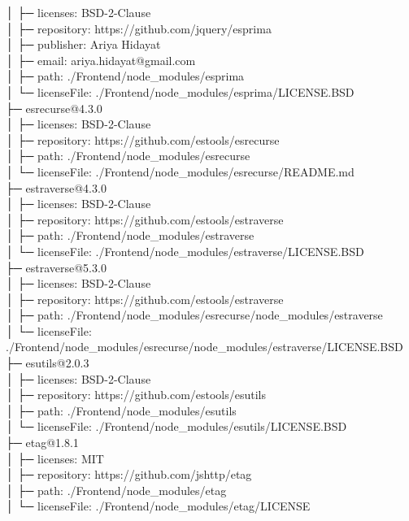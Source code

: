 │  ├─ licenses: BSD-2-Clause\\
│  ├─ repository: https://github.com/jquery/esprima\\
│  ├─ publisher: Ariya Hidayat\\
│  ├─ email: ariya.hidayat@gmail.com\\
│  ├─ path: ./Frontend/node\_modules/esprima\\
│  └─ licenseFile: ./Frontend/node\_modules/esprima/LICENSE.BSD\\
├─ esrecurse@4.3.0\\
│  ├─ licenses: BSD-2-Clause\\
│  ├─ repository: https://github.com/estools/esrecurse\\
│  ├─ path: ./Frontend/node\_modules/esrecurse\\
│  └─ licenseFile: ./Frontend/node\_modules/esrecurse/README.md\\
├─ estraverse@4.3.0\\
│  ├─ licenses: BSD-2-Clause\\
│  ├─ repository: https://github.com/estools/estraverse\\
│  ├─ path: ./Frontend/node\_modules/estraverse\\
│  └─ licenseFile: ./Frontend/node\_modules/estraverse/LICENSE.BSD\\
├─ estraverse@5.3.0\\
│  ├─ licenses: BSD-2-Clause\\
│  ├─ repository: https://github.com/estools/estraverse\\
│  ├─ path: ./Frontend/node\_modules/esrecurse/node\_modules/estraverse\\
│  └─ licenseFile: ./Frontend/node\_modules/esrecurse/node\_modules/estraverse/LICENSE.BSD\\
├─ esutils@2.0.3\\
│  ├─ licenses: BSD-2-Clause\\
│  ├─ repository: https://github.com/estools/esutils\\
│  ├─ path: ./Frontend/node\_modules/esutils\\
│  └─ licenseFile: ./Frontend/node\_modules/esutils/LICENSE.BSD\\
├─ etag@1.8.1\\
│  ├─ licenses: MIT\\
│  ├─ repository: https://github.com/jshttp/etag\\
│  ├─ path: ./Frontend/node\_modules/etag\\
│  └─ licenseFile: ./Frontend/node\_modules/etag/LICENSE\\
